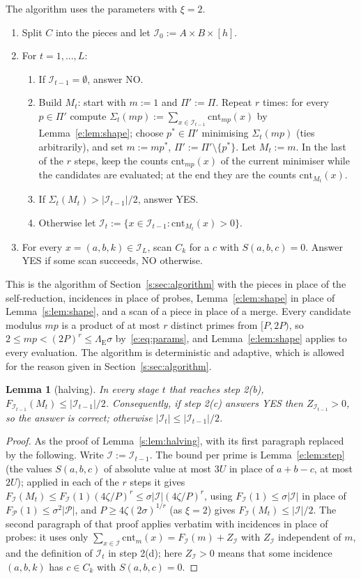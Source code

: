 \documentclass[11pt]{article}
\newtheorem{lemma}[theorem]{Lemma}
\theoremstyle{definition}
\theoremstyle{remark}
\newcommand{\cnt}{\mathrm{cnt}}
\newcommand{\Pq}{\mathcal{P}}
\newcommand{\Iq}{\mathcal{I}}
\begin{document}
The algorithm uses the parameters with $\xi=2$.
\begin{enumerate}[label=\arabic*.]
\item Split $C$ into the pieces and let $\Iq_0:=A\times B\times[h]$.
\item For $t=1,\dots,L$:
\begin{enumerate}[label=(\alph*)]
\item If $\Iq_{t-1}=\emptyset$, answer NO.
\item Build $M_t$: start with $m:=1$ and $\Pi':=\Pi$. Repeat $r$ times: for every $p\in\Pi'$ compute $\Sigma_t(mp):=\sum_{x\in\Iq_{t-1}}\cnt_{mp}(x)$ by Lemma~\ref{e:lem:shape}; choose $p^*\in\Pi'$ minimising $\Sigma_t(mp)$ (ties arbitrarily), and set $m:=mp^*$, $\Pi':=\Pi'\setminus\{p^*\}$. Let $M_t:=m$. In the last of the $r$ steps, keep the counts $\cnt_{mp}(x)$ of the current minimiser while the candidates are evaluated; at the end they are the counts $\cnt_{M_t}(x)$.
\item If $\Sigma_t(M_t)>|\Iq_{t-1}|/2$, answer YES.
\item Otherwise let $\Iq_t:=\{x\in\Iq_{t-1}:\cnt_{M_t}(x)>0\}$.
\end{enumerate}
\item For every $x=(a,b,k)\in\Iq_L$, scan $C_k$ for a $c$ with $S(a,b,c)=0$. Answer YES if some scan succeeds, NO otherwise.
\end{enumerate}
This is the algorithm of Section~\ref{s:sec:algorithm} with the pieces in place of the self-reduction, incidences in place of probes, Lemma~\ref{e:lem:shape} in place of Lemma~\ref{s:lem:shape}, and a scan of a piece in place of a merge. Every candidate modulus $mp$ is a product of at most $r$ distinct primes from $[P,2P)$, so $2\le mp<(2P)^r\le\Lambda_{\mathrm E}\sigma$ by~\eqref{e:eq:params}, and Lemma~\ref{e:lem:shape} applies to every evaluation. The algorithm is deterministic and adaptive, which is allowed for the reason given in Section~\ref{s:sec:algorithm}.

\begin{lemma}[halving]\label{e:lem:halving}
In every stage $t$ that reaches step 2(b), $F_{\Iq_{t-1}}(M_t)\le|\Iq_{t-1}|/2$. Consequently, if step 2(c) answers YES then $Z_{\Iq_{t-1}}>0$, so the answer is correct; otherwise $|\Iq_t|\le|\Iq_{t-1}|/2$.
\end{lemma}
\begin{proof}
As the proof of Lemma~\ref{s:lem:halving}, with its first paragraph replaced by the following. Write $\Iq:=\Iq_{t-1}$. The bound per prime is Lemma~\ref{e:lem:step} (the values $S(a,b,c)$ of absolute value at most $3U$ in place of $a+b-c$, at most $2U$); applied in each of the $r$ steps it gives $F_\Iq(M_t)\le F_\Iq(1)(4\zeta/P)^r\le\sigma|\Iq|(4\zeta/P)^r$, using $F_\Iq(1)\le\sigma|\Iq|$ in place of $F_\Pq(1)\le\sigma^2|\Pq|$, and $P\ge4\zeta(2\sigma)^{1/r}$ (as $\xi=2$) gives $F_\Iq(M_t)\le|\Iq|/2$. The second paragraph of that proof applies verbatim with incidences in place of probes: it uses only $\sum_{x\in\Iq}\cnt_m(x)=F_\Iq(m)+Z_\Iq$ with $Z_\Iq$ independent of $m$, and the definition of $\Iq_t$ in step 2(d); here $Z_\Iq>0$ means that some incidence $(a,b,k)$ has $c\in C_k$ with $S(a,b,c)=0$.
\end{proof}
\end{document}
